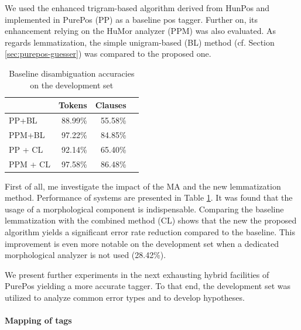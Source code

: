 We used the enhanced trigram-based algorithm derived from HunPos and implemented in PurePos (PP) as a baseline \gls{pos} tagger. 
Further on, its enhancement relying on the HuMor analyzer (PPM) was also evaluated. As regards lemmatization, the simple unigram-based (BL) method (cf. Section \ref{sec:purepos-guesser}) was compared to the proposed one. 

\begin{table}[ht]
\centering
\caption{Baseline disambiguation accuracies on the development set}\label{tab:oldhun-baselines}
\begin{tabular}{l r r r}
\hline
 & Tokens & Clauses \\
\hline
PP+BL  & 88.99\% & 55.58\% \\
PPM+BL  & 97.22\% & 84.85\% \\
PP + CL & 92.14\% & 65.40\% \\
PPM + CL & 97.58\% & 86.48\% \\
\hline
\end{tabular}
\end{table}



First of all, me investigate the impact of the MA and the new lemmatization method. 
Performance of systems are presented in Table \ref{tab:oldhun-baselines}. 
It was found that the usage of a morphological component is indispensable. 
Comparing the baseline lemmatization with the combined method (CL) shows that the new the proposed algorithm yields a significant error rate reduction compared to the baseline. 
This improvement is even more notable on the development set when a dedicated morphological analyzer is not used (28.42\%).

We present further experiments in the next exhausting hybrid facilities of PurePos yielding a more accurate tagger. To that end, the development set was utilized to analyze common error types and to develop hypotheses.


\paragraph{Mapping of tags}

